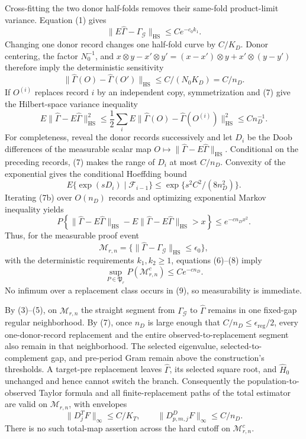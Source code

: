 Cross-fitting the two donor half-folds removes their same-fold product-limit variance.  Equation (1) gives
\[
 \|E\widehat\Gamma-\Gamma_{\mathcal G}\|_{\mathrm{HS}}
 \le Ce^{-c_0k_1}.                                      \tag{6}
\]
Changing one donor record changes one half-fold curve by \(C/K_D\).  Donor centering, the factor \(N_0^{-1}\), and
\(x\otimes y-x'\otimes y'=(x-x')\otimes y+x'\otimes(y-y')\)
therefore imply the deterministic sensitivity
\[
 \|\widehat\Gamma(O)-\widehat\Gamma(O')\|_{\mathrm{HS}}
 \le C/(N_0K_D)=C/n_D.                                  \tag{7}
\]
If \(O^{(i)}\) replaces record \(i\) by an independent copy, symmetrization and (7) give the Hilbert-space variance inequality
\[
 E\|\widehat\Gamma-E\widehat\Gamma\|_{\mathrm{HS}}^2
 \le\frac12\sum_iE\|\widehat\Gamma(O)-\widehat\Gamma(O^{(i)})\|_{\mathrm{HS}}^2
 \le Cn_D^{-1}.                                         \tag{7a}
\]
For completeness, reveal the donor records successively and let \(D_i\) be the Doob differences of the measurable scalar map
\(O\mapsto\|\widehat\Gamma-E\widehat\Gamma\|_{\mathrm{HS}}\).
Conditional on the preceding records, (7) makes the range of \(D_i\) at most \(C/n_D\).  Convexity of the exponential gives the conditional Hoeffding bound
\[
 E\{\exp(sD_i)\mid\mathcal F_{i-1}\}
 \le\exp\{s^2C^2/(8n_D^2)\}.                            \tag{7b}
\]
Iterating (7b) over \(O(n_D)\) records and optimizing exponential Markov inequality yields
\[
 P\left\{\|\widehat\Gamma-E\widehat\Gamma\|_{\mathrm{HS}}
 -E\|\widehat\Gamma-E\widehat\Gamma\|_{\mathrm{HS}}>x\right\}
 \le e^{-cn_Dx^2}.                                      \tag{8}
\]
Thus, for the measurable proof event
\[
 \mathcal M_{r,n}=
 \{\|\widehat\Gamma-\Gamma_{\mathcal G}\|_{\mathrm{HS}}\le\epsilon_0\}, \tag{9}
\]
with the deterministic requirements \(k_1,k_2\ge1\), equations (6)--(8) imply
\[
 \sup_{P\in\mathfrak P_r}P(\mathcal M_{r,n}^c)\le Ce^{-cn_D}. \tag{10}
\]
No infimum over a replacement class occurs in (9), so measurability is immediate.

By (3)--(5), on \(\mathcal M_{r,n}\) the straight segment from \(\Gamma_{\mathcal G}\) to \(\widehat\Gamma\) remains in one fixed-gap regular neighborhood.  By (7), once \(n_D\) is large enough that \(C/n_D\le\epsilon_{\mathrm{reg}}/2\), every one-donor-record replacement and the entire observed-to-replacement segment also remain in that neighborhood.  The selected eigenvalue, selected-to-complement gap, and pre-period Gram remain above the construction's thresholds.  A target-pre replacement leaves \(\widehat\Gamma\), its selected square root, and \(\widehat H_0\) unchanged and hence cannot switch the branch.  Consequently the population-to-observed Taylor formula and all finite-replacement paths of the total estimator are valid on \(\mathcal M_{r,n}\), with envelopes
\[
 \|D_j^TF\|_\infty\le C/K_T,
 \qquad \|D_{p,m,j}^DF\|_\infty\le C/n_D.              \tag{11}
\]
There is no such total-map assertion across the hard cutoff on \(\mathcal M_{r,n}^c\).

